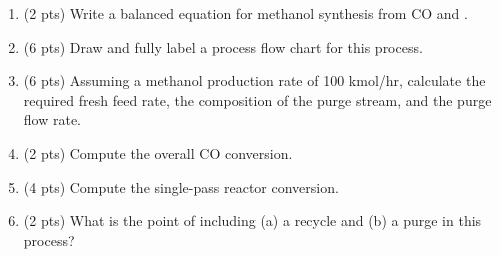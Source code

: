 \documentclass[11pt]{article}
\begin{document}
\begin{enumerate}
\item (2 pts) Write a balanced equation for methanol synthesis from CO and .
\item (6 pts) Draw and fully label a process flow chart for this process.
\item (6 pts) Assuming a methanol production rate of 100 kmol/hr, calculate the required fresh feed rate, the composition of the purge stream, and the purge flow rate.
\item (2 pts) Compute the overall CO conversion.
\item (4 pts) Compute the single-pass reactor conversion.
\item (2 pts) What is the point of including (a) a recycle and (b) a purge in this process?
\end{enumerate}
\end{document}
